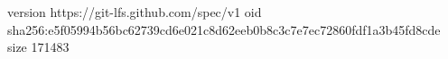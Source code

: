 version https://git-lfs.github.com/spec/v1
oid sha256:e5f05994b56bc62739cd6e021c8d62eeb0b8c3c7e7ec72860fdf1a3b45fd8cde
size 171483
